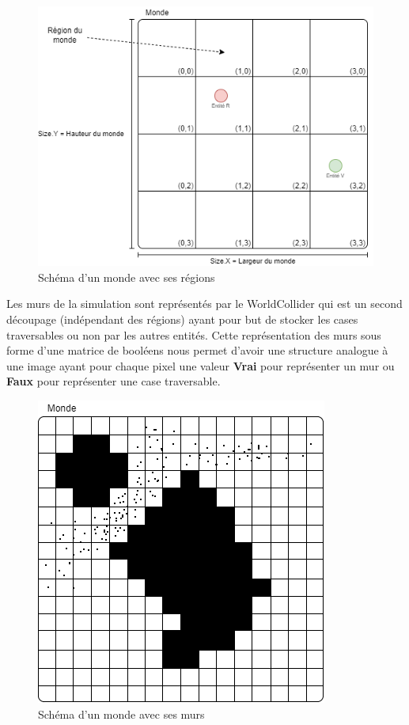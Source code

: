 \documentclass{EPUProjetDi}
\begin{document}
\begin{figure}[h]
    \centering
    \includegraphics[scale=0.5]{world.png}
    \caption{Schéma d'un monde avec ses régions}
    \label{fig:world_scheme}
\end{figure}

Les murs de la simulation sont représentés par le WorldCollider qui est un second découpage (indépendant des régions) ayant pour but 
de stocker les cases traversables ou non par les autres entités.
Cette représentation des murs sous forme d'une matrice de booléens nous permet d'avoir une structure analogue à une image ayant pour chaque pixel
une valeur \textbf{Vrai} pour représenter un mur ou \textbf{Faux} pour représenter une case traversable.

\begin{figure}[h]
    \centering
    \includegraphics[scale=0.4]{world_colliderdrawio.png}
    \caption{Schéma d'un monde avec ses murs }
    \label{fig:world_collider_scheme}
\end{figure}
\end{document}

